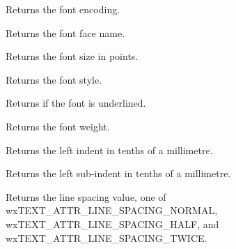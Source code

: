 
Returns the font encoding.

\label{wxtextattrgetfontfacename}


Returns the font face name.

\label{wxtextattrgetfontsize}


Returns the font size in points.

\label{wxtextattrgetfontstyle}


Returns the font style.

\label{wxtextattrgetfontunderlined}


Returns \true if the font is underlined.

\label{wxtextattrgetfontweight}


Returns the font weight.

\label{wxtextattrgetleftindent}


Returns the left indent in tenths of a millimetre.

\label{wxtextattrgetleftsubindent}


Returns the left sub-indent in tenths of a millimetre.

\label{wxtextattrgetlinespacing}


Returns the line spacing value, one of wxTEXT\_ATTR\_LINE\_SPACING\_NORMAL,
wxTEXT\_ATTR\_LINE\_SPACING\_HALF, and wxTEXT\_ATTR\_LINE\_SPACING\_TWICE.

\label{wxtextattrgetliststylename}


